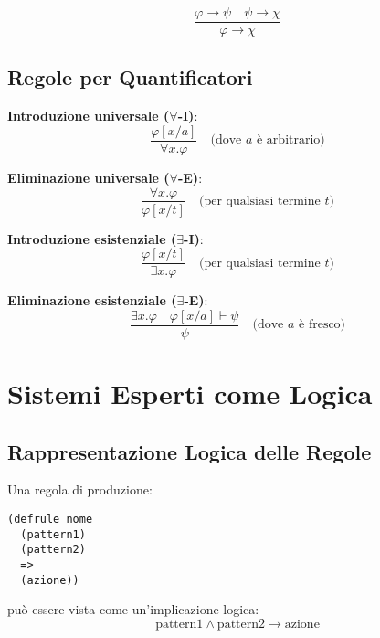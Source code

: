 \begin{teorema}
\begin{equation}
\frac{\varphi \rightarrow \psi \quad \psi \rightarrow \chi}{\varphi \rightarrow \chi}
\end{equation}
\end{teorema}

\subsection{Regole per Quantificatori}

\textbf{Introduzione universale ($\forall$-I)}:
\begin{equation}
\frac{\varphi[x/a]}{\forall x. \varphi} \quad \text{(dove $a$ è arbitrario)}
\end{equation}

\textbf{Eliminazione universale ($\forall$-E)}:
\begin{equation}
\frac{\forall x. \varphi}{\varphi[x/t]} \quad \text{(per qualsiasi termine $t$)}
\end{equation}

\textbf{Introduzione esistenziale ($\exists$-I)}:
\begin{equation}
\frac{\varphi[x/t]}{\exists x. \varphi} \quad \text{(per qualsiasi termine $t$)}
\end{equation}

\textbf{Eliminazione esistenziale ($\exists$-E)}:
\begin{equation}
\frac{\exists x. \varphi \quad \varphi[x/a] \vdash \psi}{\psi} \quad \text{(dove $a$ è fresco)}
\end{equation}

\section{Sistemi Esperti come Logica}

\subsection{Rappresentazione Logica delle Regole}

Una regola di produzione:
\begin{lstlisting}[language=CLIPS]
(defrule nome
  (pattern1)
  (pattern2)
  =>
  (azione))
\end{lstlisting}

può essere vista come un'implicazione logica:
\begin{equation}
\text{pattern1} \land \text{pattern2} \rightarrow \text{azione}
\end{equation}

